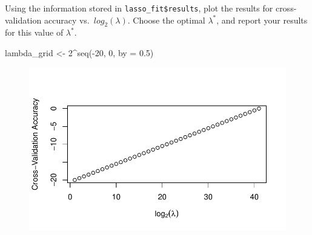 \documentclass[
  letterpaper,
  DIV=11,
  numbers=noendperiod]{scrartcl}
\newenvironment{Shaded}{\begin{snugshade}}{\end{snugshade}}
\newcommand{\AttributeTok}[1]{\textcolor[rgb]{0.40,0.45,0.13}{#1}}
\newcommand{\DecValTok}[1]{\textcolor[rgb]{0.68,0.00,0.00}{#1}}
\newcommand{\FloatTok}[1]{\textcolor[rgb]{0.68,0.00,0.00}{#1}}
\newcommand{\FunctionTok}[1]{\textcolor[rgb]{0.28,0.35,0.67}{#1}}
\newcommand{\NormalTok}[1]{\textcolor[rgb]{0.00,0.23,0.31}{#1}}
\newcommand{\OtherTok}[1]{\textcolor[rgb]{0.00,0.23,0.31}{#1}}
\newcommand{\SpecialCharTok}[1]{\textcolor[rgb]{0.37,0.37,0.37}{#1}}
\newcommand{\StringTok}[1]{\textcolor[rgb]{0.13,0.47,0.30}{#1}}
\begin{document}
Using the information stored in \texttt{lasso\_fit\$results}, plot the
results for cross-validation accuracy vs.~\(log_2(\lambda)\). Choose the
optimal \(\lambda^*\), and report your results for this value of
\(\lambda^*\).

\begin{Shaded}
\begin{Highlighting}[]
\NormalTok{lambda\_grid }\OtherTok{\textless{}{-}} \DecValTok{2}\SpecialCharTok{\^{}}\FunctionTok{seq}\NormalTok{(}\SpecialCharTok{{-}}\DecValTok{20}\NormalTok{, }\DecValTok{0}\NormalTok{, }\AttributeTok{by =} \FloatTok{0.5}\NormalTok{)}
\end{Highlighting}
\end{Shaded}

\begin{Shaded}
\end{Shaded}

\begin{figure}[H]

{\centering \includegraphics{hm4_files/figure-pdf/unnamed-chunk-23-1.pdf}

}

\end{figure}
\end{document}
